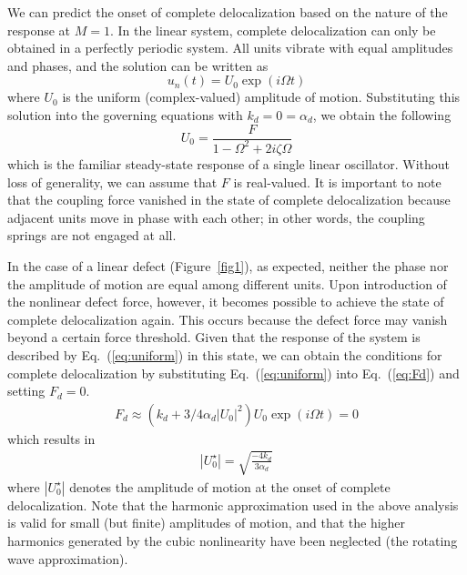 \documentclass[aps,pre,twocolumn,groupedaddress]{revtex4-1}
\begin{document}
We can predict the onset of complete delocalization based on the nature of the response at $M=1$. In the linear system, complete delocalization can only be obtained in a perfectly periodic system. All units vibrate with equal amplitudes and phases, and the solution can be written as
\begin{equation}
	\label{eq:uniform}
	u_n(t) = U_0 \exp\left( i \Omega t \right)
\end{equation}
where $U_0$ is the uniform (complex-valued) amplitude of motion. Substituting this solution into the governing equations with $k_d=0=\alpha_d$, we obtain the following 
\begin{equation}
	\label{eq:U0}
	U_0 = \frac{F}{1-\Omega^2 + 2i \zeta \Omega}
\end{equation}
which is the familiar steady-state response of a single linear oscillator. Without loss of generality, we can assume that $F$ is real-valued. 
It is important to note that the coupling force vanished in the state of complete delocalization because adjacent units move in phase with each other; in other words, the coupling springs are not engaged at all. 

In the case of a linear defect (Figure~\ref{fig1}), as expected, neither the phase nor the amplitude of motion are equal among different units. Upon introduction of the nonlinear defect force, however, it becomes possible to achieve the state of complete delocalization again. This occurs because the defect force may vanish beyond a certain force threshold. 
Given that the response of the system is described by Eq.~(\ref{eq:uniform}) in this state, we can obtain the conditions for complete delocalization by substituting Eq.~(\ref{eq:uniform}) into Eq.~(\ref{eq:Fd}) and setting $F_d=0$. 
\begin{eqnarray*}
	F_d \approx (k_d  + 3/4 \alpha_d |U_0|^2 ) U_0\exp(i\Omega t)=0
\end{eqnarray*}
which results in 
\begin{eqnarray}
	\label{eq:U0star}
	|U_0^\star| = \sqrt{\frac{-4k_d}{3\alpha_d}}
\end{eqnarray}
where $|U_0^\star|$ denotes the amplitude of motion at the onset of complete delocalization. Note that the harmonic approximation used in the above analysis is valid for small (but finite) amplitudes of motion, and that the higher harmonics generated by the cubic nonlinearity have been neglected (the rotating wave approximation). 
\end{document}
